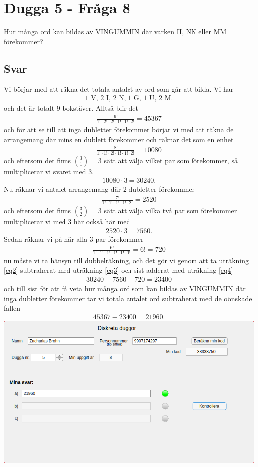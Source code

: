 \documentclass[a4paper,12pt]{article}
\begin{document}
%
\section{Dugga 5 - Fråga 8}
Hur många ord kan bildas av VINGUMMIN där varken II, NN eller MM förekommer?
\subsection*{Svar}
Vi börjar med att räkna det totala antalet av ord som går att bilda. Vi har
\begin{align}
  1 \text{ V, } 2 \text{ I, } 2 \text{ N, } 1 \text{ G, } 1 \text{ U, } 2 \text{ M}.
\end{align}
och det är totalt 9 bokstäver. Alltså blir det
\begin{align}\label{eq1}
    \frac{9!}{1! \cdot 2! \cdot 2! \cdot 1! \cdot 1! \cdot 2!} = 45367
\end{align}
och för att se till att inga dubletter förekommer börjar vi med att räkna de
arrangemang där mins en dublett förekommer och räknar det som en enhet
\begin{align}
    \frac{8!}{1! \cdot 1! \cdot 2! \cdot 1! \cdot 1! \cdot 2!} = 10080
\end{align}
och eftersom det finns $\binom{3}{1} = 3$ sätt att välja vilket par som
förekommer, så multiplicerar vi svaret med $3$.
\begin{align}\label{eq2}
    10080 \cdot 3 = 30240.
\end{align}
Nu räknar vi antalet arrangemang där 2 dubletter förekommer
\begin{align}
    \frac{7!}{1! \cdot 1! \cdot 1! \cdot 1! \cdot 2!} = 2520
\end{align}
och eftersom det finns $\binom{3}{2} = 3$ sätt att välja vilka två par som
förekommer multiplicerar vi med 3 här också
här med
\begin{align}\label{eq3}
    2520 \cdot 3 = 7560.
\end{align}
Sedan räknar vi på när alla 3 par förekommer
\begin{align}\label{eq4}
    \frac{6!}{1! \cdot 1! \cdot 1! \cdot 1! \cdot 1! \cdot 1!} = 6! = 720
\end{align}
nu måste vi ta hänsyn till dubbelräkning, och det gör vi genom att ta uträkning
\ref*{eq2} subtraherat med uträkning \ref*{eq3} och sist adderat med uträkning
\ref*{eq4}
\begin{align}
    30240 - 7560 + 720 = 23400
\end{align}
och till sist för att få veta hur många ord som kan bildas av VINGUMMIN där
inga dubletter förekommer tar vi totala antalet ord subtraherat med de oönskade
fallen
\begin{align}
    45367 - 23400 = 21960.
\end{align}
\includegraphics[width=\textwidth]{RMXBJIG.png}
%
\end{document}

